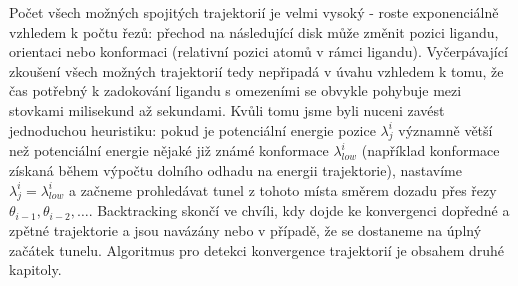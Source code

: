 Počet všech možných spojitých trajektorií je velmi vysoký - roste exponenciálně vzhledem
k počtu řezů: přechod na následující disk může změnit pozici ligandu, orientaci
nebo konformaci (relativní pozici atomů v rámci ligandu). Vyčerpávající zkoušení
všech možných trajektorií tedy nepřipadá v úvahu vzhledem k tomu, že čas
potřebný k zadokování ligandu s omezeními se obvykle pohybuje mezi stovkami
milisekund až sekundami. Kvůli tomu jsme byli nuceni zavést jednoduchou heuristiku:
pokud je potenciální energie pozice $ \lambda^i_j $ významně větší než potenciální
energie nějaké již známé konformace $ \lambda^i_{low} $ (například konformace
získaná během výpočtu dolního odhadu na energii trajektorie), nastavíme
$ \lambda^i_j = \lambda^i_{low} $ a začneme prohledávat tunel z tohoto místa
směrem dozadu přes řezy $ \theta_{i-1}, \theta_{i-2}, \dots $. Backtracking
skončí ve chvíli, kdy dojde ke konvergenci dopředné a zpětné trajektorie a jsou
navázány nebo v případě, že se dostaneme na úplný začátek tunelu.
Algoritmus pro detekci konvergence trajektorií je obsahem druhé kapitoly.

